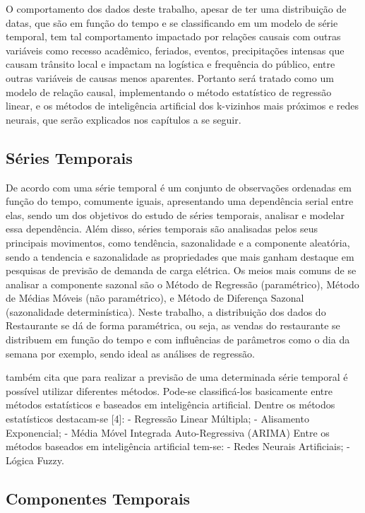\documentclass[	12pt, Times, openright, twoside, a4paper, english, brazil]{abntex2}
\begin{document}
O comportamento dos dados deste trabalho, apesar de ter uma distribuição de datas, que são em função do tempo e se classificando em um modelo de série temporal, tem tal comportamento impactado por relações causais com outras variáveis como recesso acadêmico, feriados, eventos, precipitações intensas que causam trânsito local e impactam na logística e frequência do público, entre outras variáveis de causas menos aparentes. Portanto será tratado como um modelo de relação causal, implementando o método estatístico de regressão linear, e os métodos de inteligência artificial dos k-vizinhos mais próximos e redes neurais, que serão explicados nos capítulos a se seguir.

\subsection{Séries Temporais}
De acordo com  \cite{Morettin1987} uma série temporal é um conjunto de observações ordenadas em função do tempo, comumente iguais, apresentando uma dependência serial entre elas, sendo um dos objetivos do estudo de séries temporais, analisar e modelar essa dependência. Além disso, séries temporais são analisadas pelos seus principais movimentos, como tendência, sazonalidade e a componente aleatória, sendo a tendencia e sazonalidade as propriedades que mais ganham destaque em pesquisas de previsão de demanda de carga elétrica. Os meios mais comuns de se analisar a componente sazonal são o Método de Regressão (paramétrico), Método de Médias Móveis (não paramétrico), e Método de Diferença Sazonal (sazonalidade determinística).  Neste trabalho, a distribuição dos dados do Restaurante se dá de forma paramétrica, ou seja, as vendas do restaurante se distribuem em função do tempo e com influências de parâmetros como o dia da semana por exemplo, sendo ideal as análises de regressão. 

\cite{Almeida2013} também cita que para realizar a previsão de uma determinada série temporal é possível utilizar diferentes métodos. Pode-se classificá-los basicamente entre métodos estatísticos e baseados em inteligência artificial.
Dentre os métodos estatísticos destacam-se [4]:
- Regressão Linear Múltipla;
- Alisamento Exponencial;
- Média Móvel Integrada Auto-Regressiva (ARIMA)
Entre os métodos baseados em inteligência artificial tem-se:
- Redes Neurais Artificiais;
- Lógica Fuzzy.

\subsection{Componentes Temporais}
\end{document}
